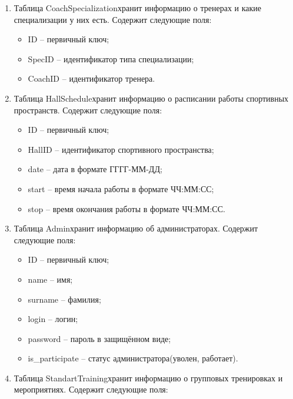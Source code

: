 \begin{enumerate}
	\begin{itemize}[label=—]
		\item ID -- первичный ключ;
		\item name -- название;
		\item HallID -- идентификатор спортивного пространства для проведения тренировок тренером с такой специализацией.
	\end{itemize}
	\item Таблица \guillemotleft CoachSpecialization\guillemetright хранит информацию о тренерах и какие специализации у них есть. Содержит следующие поля:
	\begin{itemize}[label=—]
		\item ID -- первичный ключ;
		\item SpecID -- идентификатор типа специализации;
		\item CoachID -- идентификатор тренера.
	\end{itemize}
	\item Таблица \guillemotleft HallSchedule\guillemetright хранит информацию о расписании работы спортивных пространств. Содержит следующие поля:
	\begin{itemize}[label=—]
		\item ID -- первичный ключ;
		\item HallID -- идентификатор спортивного пространства;
		\item date -- дата в формате ГГГГ-ММ-ДД;
		\item start -- время начала работы в формате ЧЧ:ММ:СС;
		\item stop -- время окончания работы в формате ЧЧ:ММ:СС.
	\end{itemize}
	\item Таблица \guillemotleft Admin\guillemotright хранит информацию об администраторах. Содержит следующие поля:
	\begin{itemize}[label=—]
		\item ID -- первичный ключ;
		\item name -- имя;
		\item surname -- фамилия;
		\item login -- логин;
		\item password -- пароль в защищённом виде;
		\item is\_participate -- статус администратора(уволен, работает).
	\end{itemize}
	\item Таблица \guillemotleft StandartTraining\guillemotright хранит информацию о групповых тренировках и мероприятиях. Содержит следующие поля:

\end{enumerate}
